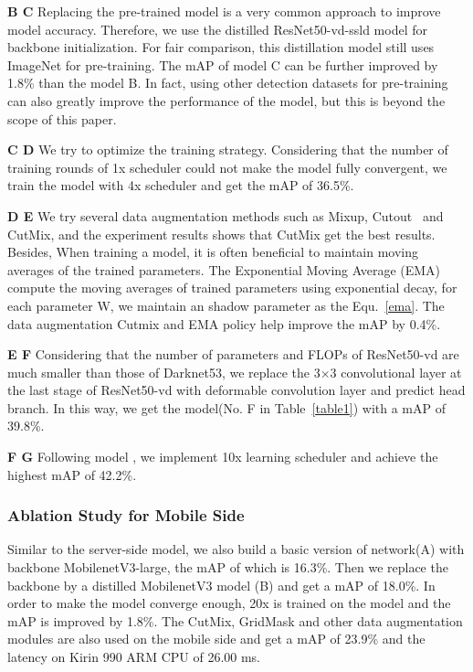 \documentclass[10pt,twocolumn,letterpaper]{article}
\begin{document}
{\bf{B  C}} Replacing the pre-trained model is a very common approach to improve model accuracy. Therefore, we use the distilled ResNet50-vd-ssld model for backbone initialization. For fair comparison, this distillation model still uses ImageNet for pre-training. The mAP of model C can be further improved by 1.8\% than the model B. In fact, using other detection datasets for pre-training can also greatly improve the performance of the model, but this is beyond the scope of this paper.
    
{\bf{C  D}} We try to optimize the training strategy. Considering that the number of training rounds of 1x scheduler could not make the model fully convergent, we train the model with 4x scheduler and get the mAP of 36.5\%.
    
{\bf{D  E}} We try several data augmentation methods such as Mixup, Cutout~\cite{devries2017improved} and CutMix, and the experiment results shows that CutMix get the best results. Besides, When training a model, it is often beneficial to maintain moving averages of the trained parameters. The Exponential Moving Average (EMA) compute the moving averages of trained parameters using exponential decay, for each parameter W, we maintain an shadow parameter as the Equ.~\ref{ema}. The data augmentation Cutmix and EMA policy help improve the mAP by 0.4\%.

{\bf{E  F}} Considering that the number of parameters and FLOPs of ResNet50-vd are much smaller than those of Darknet53, we replace the 3×3 convolutional layer at the last stage of ResNet50-vd with deformable convolution layer and predict head branch. In this way, we get the model(No. F in Table~\ref{table1}) with a mAP of 39.8\%. 
    
{\bf{F  G}} Following model , we implement 10x learning scheduler and achieve the highest mAP of 42.2\%.
    
    \subsubsection{Ablation Study for Mobile Side}
    Similar to the server-side model, we also build a basic version of  network(A) with backbone MobilenetV3-large, the mAP of which is 16.3\%. Then we replace the backbone by a distilled MobilenetV3 model (B) and get a mAP of 18.0\%. In order to make the model converge enough, 20x is trained on the model and the mAP is improved by 1.8\%. The CutMix, GridMask and other data augmentation modules are also used on the mobile side and get a mAP of 23.9\% and the latency on Kirin 990 ARM CPU of 26.00 ms. 
\end{document}
